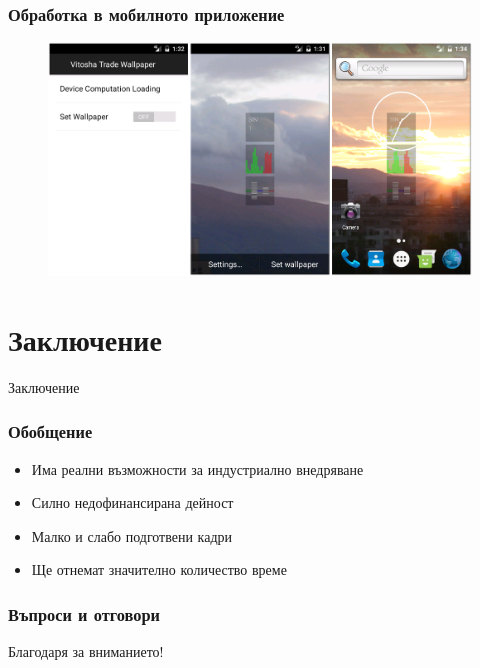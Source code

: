 \documentclass{beamer}
\begin{document}
\begin{frame}
\frametitle{Обработка в мобилното приложение}
\begin{figure}[h]
  \centering
  \includegraphics[width=\textwidth]{MobileClient.png}
\end{figure}
\end{frame}

\section{Заключение}

\begin{frame}
\center \huge{Заключение}
\end{frame}

\begin{frame}
\frametitle{Обобщение}
\begin{itemize}
	\item Има реални възможности за индустриално внедряване
\end{itemize}
	
\begin{itemize}
\item Силно недофинансирана дейност
	\item Малко и слабо подготвени кадри
	\item Ще отнемат значително количество време
\end{itemize}
\end{frame}

\begin{frame}
\frametitle{Въпроси и отговори}
\center \huge{Благодаря за вниманието!}
\end{frame}
\end{document}
